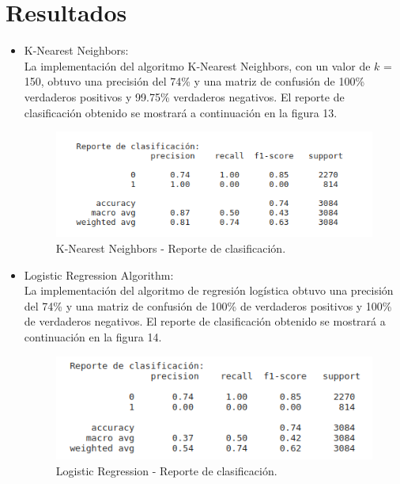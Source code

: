 \documentclass[runningheads]{llncs}
\begin{document}
\section{Resultados}
\begin{itemize}
    \item K-Nearest Neighbors:\\
    La implementación del algoritmo K-Nearest Neighbors, con un valor de $k$ = 150, obtuvo una precisión del 74\% y una matriz de confusión de 100\% verdaderos positivos y 99.75\% verdaderos negativos. El reporte de clasificación obtenido se mostrará a continuación en la figura 13. 
   
    \begin{figure}
        \centering
        \includegraphics[width=0.8\columnwidth]{KNN_RC.png}
        \caption{K-Nearest Neighbors - Reporte de clasificación.}
        \label{fig:comand}%
    \end{figure}
    
    \item Logistic Regression Algorithm:\\
        La implementación del algoritmo de regresión logística obtuvo una precisión del 74\% y una matriz de confusión de 100\% de verdaderos positivos y 100\% de verdaderos negativos. El reporte de clasificación obtenido se mostrará a continuación en la figura 14. 
  
    \begin{figure}
        \centering
        \includegraphics[width=0.8\columnwidth]{LR_RC.png}
        \caption{Logistic Regression - Reporte de clasificación.}
        \label{fig:comand}%
    \end{figure}
    

\end{itemize}
\end{document}
